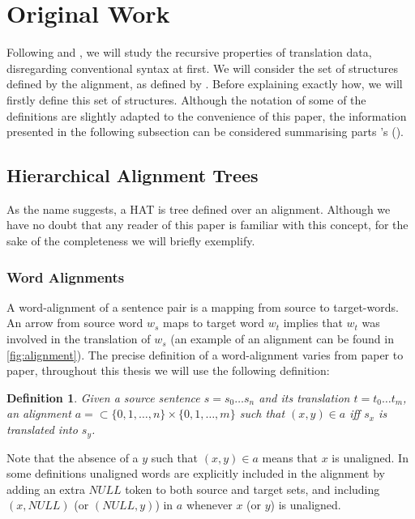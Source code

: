 \documentclass{report}
\theoremstyle{definition}
\theoremstyle{plain}
\newtheorem{definition}{Definition}
\def\citepos#1{\citeauthor{#1}'s (\citeyear{#1})}
\begin{document}
\section{Original Work}

Following \cite{simaan2013hats} and \cite{wellington2006empirical}, we will study the recursive properties of translation data, disregarding conventional syntax at first. We will consider the set of structures defined by the alignment, as defined by \cite{simaan2013hats}. Before explaining exactly how, we will firstly define this set of structures. Although the notation of some of the definitions are slightly adapted to the convenience of this paper, the information presented in the following subsection can be considered summarising parts \citepos{simaan2013hats}.

\subsection{Hierarchical Alignment Trees}

As the name suggests, a HAT is tree defined over an alignment. Although we have no doubt that any reader of this paper is familiar with this concept, for the sake of the completeness we will briefly exemplify.

\subsubsection{Word Alignments} A word-alignment of a sentence pair is a mapping from source to target-words. An arrow from source word $w_s$ maps to target word $w_t$ implies that $w_t$ was involved in the translation of $w_s$ (an example of an alignment can be found in \ref{fig:alignment}). The precise definition of a word-alignment varies from paper to paper, throughout this thesis we will use the following definition:

\begin{definition}
Given a source sentence $s = s_0 \ldots s_n$ and its translation $t = t_0 \ldots t_m$, an alignment $a = \subset \{0,1,\ldots,n\} \times \{0,1,\ldots,m\}$ such that $(x,y)\in a$ iff $s_x$ is translated into $s_y$.
\end{definition}

Note that the absence of a $y$ such that $(x,y)\in a$ means that $x$ is unaligned. In some definitions unaligned words are explicitly included in the alignment by adding an extra $NULL$ token to both source and target sets, and including $(x,NULL)$ (or $(NULL, y)$) in $a$ whenever $x$ (or $y$) is unaligned. 
\end{document}
